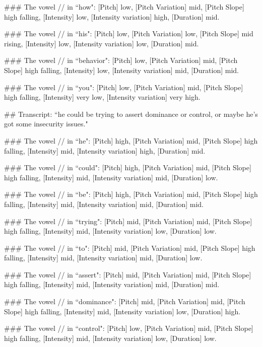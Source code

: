 \begin{tcolorbox}[blue_box, title = {{Example: Vowel-level Acoustic Feature}}]
\#\#\# The vowel // in ``how": [Pitch] low, [Pitch Variation] mid, [Pitch Slope] high falling, [Intensity] low, [Intensity variation] high, [Duration] mid.

\#\#\# The vowel // in ``his": [Pitch] low, [Pitch Variation] low, [Pitch Slope] mid rising, [Intensity] low, [Intensity variation] low, [Duration] mid.

\#\#\# The vowel // in ``behavior": [Pitch] low, [Pitch Variation] mid, [Pitch Slope] high falling, [Intensity] low, [Intensity variation] mid, [Duration] mid.

\#\#\# The vowel // in ``you": [Pitch] low, [Pitch Variation] mid, [Pitch Slope] high falling, [Intensity] very low, [Intensity variation] very high.

\#\# Transcript: ``he could be trying to assert dominance or control, or maybe he's got some insecurity issues."

\#\#\# The vowel // in ``he": [Pitch] high, [Pitch Variation] mid, [Pitch Slope] high falling, [Intensity] mid, [Intensity variation] high, [Duration] mid.

\#\#\# The vowel // in ``could": [Pitch] high, [Pitch Variation] mid, [Pitch Slope] high falling, [Intensity] mid, [Intensity variation] mid, [Duration] low.

\#\#\# The vowel // in ``be": [Pitch] high, [Pitch Variation] mid, [Pitch Slope] high falling, [Intensity] mid, [Intensity variation] mid, [Duration] mid.

\#\#\# The vowel // in ``trying": [Pitch] mid, [Pitch Variation] mid, [Pitch Slope] high falling, [Intensity] mid, [Intensity variation] low, [Duration] low.

\#\#\# The vowel // in ``to": [Pitch] mid, [Pitch Variation] mid, [Pitch Slope] high falling, [Intensity] mid, [Intensity variation] mid, [Duration] low.

\#\#\# The vowel // in ``assert": [Pitch] mid, [Pitch Variation] mid, [Pitch Slope] high falling, [Intensity] mid, [Intensity variation] mid, [Duration] mid.

\#\#\# The vowel // in ``dominance": [Pitch] mid, [Pitch Variation] mid, [Pitch Slope] high falling, [Intensity] mid, [Intensity variation] low, [Duration] high.

\#\#\# The vowel // in ``control": [Pitch] low, [Pitch Variation] mid, [Pitch Slope] high falling, [Intensity] mid, [Intensity variation] low, [Duration] low.


\end{tcolorbox}

